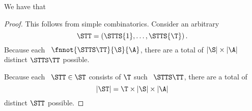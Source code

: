 \begin{proposition}
  We have that %
\end{proposition}

\begin{proof}
  This follows from simple combinatorics.
  Consider an arbitrary \str
  $$\STT = \left(\STTS{1},\ldots,\STTS{\T}\right).$$
  Because each \stpstr\ $\fnnot{\STTS\TT}{\S}{\A}$,
  there are a total of $|\S| \times |\A|$ distinct $\STTS\TT$ possible.

  Because each \str\ $\STT \in \ST$ consists of $\T$ such \stpstrs\ $\STTS\TT$,
  there are a total of 
  $$|\ST| = \T \times |\S| \times |\A|$$
  distinct $\STT$ possible.
\end{proof}
